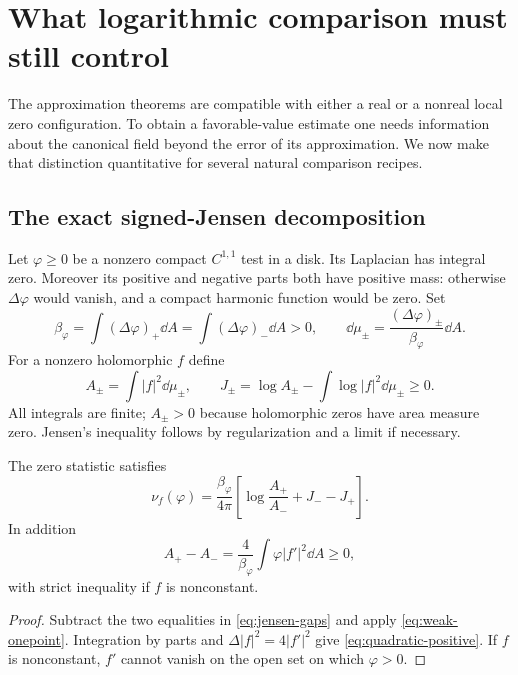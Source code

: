 \section{What logarithmic comparison must still control}\label{sec:comparisons}

The approximation theorems are compatible with either a real or a
nonreal local zero configuration. To obtain a favorable-value
estimate one needs information about the canonical field beyond
the error of its approximation. We now make that distinction
quantitative for several natural comparison recipes.

\subsection{The exact signed-Jensen decomposition}

Let $\varphi\ge0$ be a nonzero compact $C^{1,1}$ test in a disk.
Its Laplacian has integral zero. Moreover its positive and
negative parts both have positive mass: otherwise $\Delta\varphi$
would vanish, and a compact harmonic function would be zero.
Set
\begin{equation}\label{eq:signed-measures}
 \beta_\varphi=\int(\Delta\varphi)_+\dd A
             =\int(\Delta\varphi)_-\dd A>0,\qquad
 \dd\mu_\pm=\frac{(\Delta\varphi)_\pm}{\beta_\varphi}\dd A.
\end{equation}
For a nonzero holomorphic $f$ define
\begin{equation}\label{eq:jensen-gaps}
 A_\pm=\int|f|^2\dd\mu_\pm,\qquad
 J_\pm=\log A_\pm-\int\log|f|^2\dd\mu_\pm\ge0.
\end{equation}
All integrals are finite; $A_\pm>0$ because holomorphic zeros have
area measure zero. Jensen's inequality follows by regularization
and a limit if necessary.

\begin{proposition}\label{prop:signed-jensen}
The zero statistic satisfies
\begin{equation}\label{eq:signed-jensen}
 \nu_f(\varphi)=\frac{\beta_\varphi}{4\pi}
       \left[\log\frac{A_+}{A_-}+J_--J_+\right].
\end{equation}
In addition
\begin{equation}\label{eq:quadratic-positive}
 A_+-A_-=\frac4{\beta_\varphi}
                       \int\varphi|f'|^2\dd A\ge0,
\end{equation}
with strict inequality if $f$ is nonconstant.
\end{proposition}
\begin{proof}
Subtract the two equalities in \eqref{eq:jensen-gaps} and
apply \eqref{eq:weak-onepoint}. Integration by parts and
$\Delta|f|^2=4|f'|^2$ give \eqref{eq:quadratic-positive}.
If $f$ is nonconstant, $f'$ cannot vanish on the open set on
which $\varphi>0$.
\end{proof}

